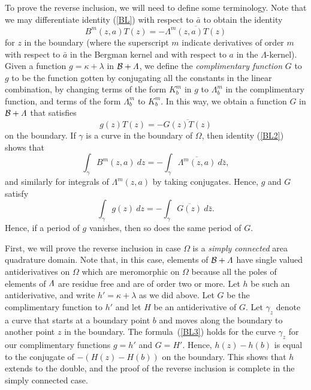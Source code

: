 \documentclass[12pt]{amsart}
\newcommand\Om{\Omega}
\numberwithin{equation}{section}
\begin{document}
To prove the reverse inclusion, we will need to define
some terminology. Note that we may differentiate identity
(\ref{BL}) with respect to $\bar a$ to obtain the identity
\begin{equation}
\label{BL2}
B^m(z,a)T(z)=-\overline{\Lambda^m(z,a)T(z)}
\end{equation}
for $z$ in the boundary (where the superscript $m$ indicate
derivatives of order $m$ with respect to $\bar a$ in the Bergman
kernel and with respect to $a$ in the $\Lambda$-kernel).
Given a function $g=\kappa+\lambda$ in
$\mathcal{B}+\mathnormal{\Lambda}$, we define the
{\it complimentary function\/} $G$ to $g$ to be the
function gotten by conjugating all the constants in
the linear combination, by changing terms 
of the form $K_b^m$ in $g$ to $\Lambda_b^m$
in the complimentary function, and terms of the form
$\Lambda_b^m$ to $K_b^m$. In this way, we obtain
a function $G$ in $\mathcal{B}+\mathnormal{\Lambda}$
that satisfies
$$g(z)T(z)=-\overline{G(z)T(z)}$$
on the boundary. If $\gamma$ is a curve in the boundary of $\Om$,
then identity (\ref{BL2}) shows that
\begin{equation*}
\int_{\gamma} B^m(z,a)\ dz=
-\int_{\gamma} \overline{\Lambda^m(z,a)}\ d\bar z,
\end{equation*}
and similarly for integrals of $\Lambda^m(z,a)$ by
taking conjugates. Hence, $g$ and $G$ satisfy
\begin{equation}
\label{BL3}
\int_{\gamma} g(z)\ dz=
-\int_{\gamma} \overline{G(z)}\ d\bar z.
\end{equation}
Hence, if a period of $g$ vanishes, then so does the
same period of $G$.

First, we will prove the reverse inclusion in case $\Om$
is a {\it simply connected\/} area quadrature domain. Note
that, in this case, elements
of $\mathcal{B}+\mathnormal{\Lambda}$ have single valued
antiderivatives on $\Om$ which are meromorphic on $\Om$
because all the poles of elements of $\mathnormal{\Lambda}$
are residue free and are of order two or more. Let $h$ be
such an antiderivative,
and write $h' =\kappa +\lambda$ as we did above. Let $G$
be the complimentary function to $h'$ and let $H$ be an
antiderivative of $G$. Let
$\gamma_z$ denote a curve that starts at a boundary point
$b$ and moves along the boundary to another point $z$ in
the boundary. The formula~(\ref{BL3}) holds for the
curve $\gamma_z$ for our complimentary functions $g=h'$
and $G=H'$. Hence, 
$h(z)-h(b)$ is equal to the conjugate of $-(H(z)-H(b))$
on the boundary.  This shows that $h$ extends to the double,
and the proof of the reverse inclusion is complete in the
simply connected case.
\end{document}
